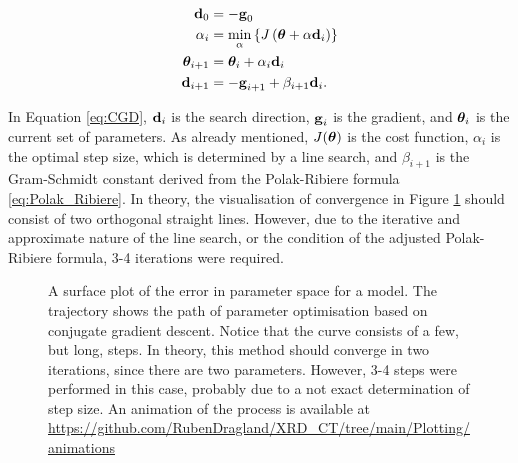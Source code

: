 \begin{align}\label{eq:CGD}
    \begin{split}
        \bm{\mathrm{d}}_{0}        & = - \bm{\mathrm{g}}_{0}                                                    \\
        \alpha_{i}        & = \min_{\alpha} \left\{  J\left(\mathrm{\boldsymbol{\theta}} + \alpha \bm{\mathrm{d}}_{i} \right) \right\} \\
        \mathrm{\boldsymbol{\theta}}_{i+1} & = \mathrm{\boldsymbol{\theta}}_{i} + \alpha_{i} \bm{\mathrm{d}}_{i}                         \\
        \bm{\mathrm{d}}_{i+1}      & = -\bm{\mathrm{g}}_{i+1} + \beta_{i+1} \bm{\mathrm{d}}_{i}.                          \\
    \end{split}
\end{align}

In Equation \eqref{eq:CGD}, $\bm{\mathrm{d}}_{i}$ is the search direction, $\bm{\mathrm{g}}_{i}$ is the gradient, and $\mathrm{\boldsymbol{\theta}}_{i}$ is the current set of parameters.
As already mentioned, $J(\mathrm{\boldsymbol{\theta}})$ is the cost function, $\alpha_{i}$ is the optimal step size, which is determined by a line search, and $\beta_{i+1}$ is the Gram-Schmidt constant derived from the Polak-Ribiere formula \eqref{eq:Polak_Ribiere}.
In theory, the visualisation of convergence in Figure \ref{fig:CGD_surface} should consist of two orthogonal straight lines.
However, due to the iterative and approximate nature of the line search, or the condition of the adjusted Polak-Ribiere formula, 3-4 iterations were required.

\begin{figure}[h!]
    \centering
    
    \caption{A surface plot of the error in parameter space for a model.
        The trajectory shows the path of parameter optimisation based on conjugate gradient descent.
        Notice that the curve consists of a few, but long, steps.
        In theory, this method should converge in two iterations, since there are two parameters.
        However, 3-4 steps were performed in this case, probably due to a not exact determination of step size.
        An animation of the process is available at \url{https://github.com/RubenDragland/XRD_CT/tree/main/Plotting/animations}
    }
    \label{fig:CGD_surface}
\end{figure}



